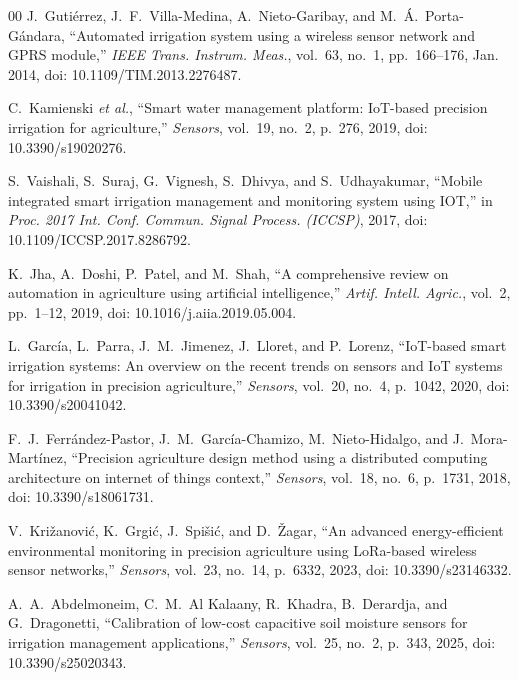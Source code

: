 \documentclass[conference]{IEEEtran}
\begin{document}
\begin{thebibliography}{00}
 J.~Guti\'{e}rrez, J.~F.~Villa-Medina, A.~Nieto-Garibay, and M.~\'{A}.~Porta-G\'{a}ndara, ``Automated irrigation system using a wireless sensor network and GPRS module,'' \emph{IEEE Trans. Instrum. Meas.}, vol.~63, no.~1, pp.~166--176, Jan. 2014, doi: 10.1109/TIM.2013.2276487.

 C.~Kamienski \emph{et al.}, ``Smart water management platform: IoT-based precision irrigation for agriculture,'' \emph{Sensors}, vol.~19, no.~2, p.~276, 2019, doi: 10.3390/s19020276.

 S.~Vaishali, S.~Suraj, G.~Vignesh, S.~Dhivya, and S.~Udhayakumar, ``Mobile integrated smart irrigation management and monitoring system using IOT,'' in \emph{Proc. 2017 Int. Conf. Commun. Signal Process. (ICCSP)}, 2017, doi: 10.1109/ICCSP.2017.8286792.

 K.~Jha, A.~Doshi, P.~Patel, and M.~Shah, ``A comprehensive review on automation in agriculture using artificial intelligence,'' \emph{Artif. Intell. Agric.}, vol.~2, pp.~1--12, 2019, doi: 10.1016/j.aiia.2019.05.004.

 L.~Garc\'{i}a, L.~Parra, J.~M.~Jimenez, J.~Lloret, and P.~Lorenz, ``IoT-based smart irrigation systems: An overview on the recent trends on sensors and IoT systems for irrigation in precision agriculture,'' \emph{Sensors}, vol.~20, no.~4, p.~1042, 2020, doi: 10.3390/s20041042.

 F.~J.~Ferr\'{a}ndez-Pastor, J.~M.~Garc\'{i}a-Chamizo, M.~Nieto-Hidalgo, and J.~Mora-Mart\'{i}nez, ``Precision agriculture design method using a distributed computing architecture on internet of things context,'' \emph{Sensors}, vol.~18, no.~6, p.~1731, 2018, doi: 10.3390/s18061731.

 V.~Kri\v{z}anovi\'{c}, K.~Grgi\'{c}, J.~Spi\v{s}i\'{c}, and D.~\v{Z}agar, ``An advanced energy-efficient environmental monitoring in precision agriculture using LoRa-based wireless sensor networks,'' \emph{Sensors}, vol.~23, no.~14, p.~6332, 2023, doi: 10.3390/s23146332.

 A.~A.~Abdelmoneim, C.~M.~Al Kalaany, R.~Khadra, B.~Derardja, and G.~Dragonetti, ``Calibration of low-cost capacitive soil moisture sensors for irrigation management applications,'' \emph{Sensors}, vol.~25, no.~2, p.~343, 2025, doi: 10.3390/s25020343.


\end{thebibliography}
\end{document}
